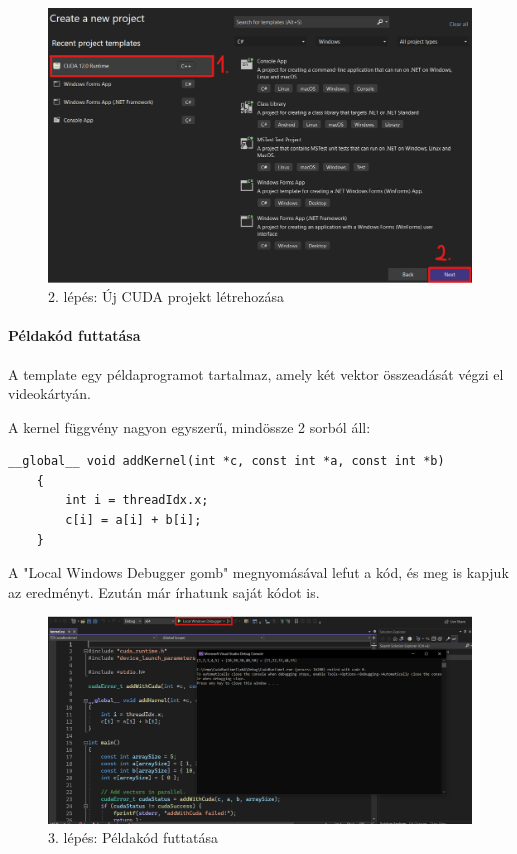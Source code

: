 \begin{figure}[ht!]
	\centering
	\includegraphics[width=150mm, keepaspectratio] {figures/install-2.png}
	\caption{2. lépés: Új CUDA projekt létrehozása}
\end{figure}

\paragraph{Példakód futtatása}
A template egy példaprogramot tartalmaz, amely két vektor összeadását végzi el videokártyán.

A kernel függvény nagyon egyszerű, mindössze 2 sorból áll: \cite{CUDAdoc}
\begin{lstlisting}[style=CStyle]
	__global__ void addKernel(int *c, const int *a, const int *b)
	{
		int i = threadIdx.x;
		c[i] = a[i] + b[i];
	}
\end{lstlisting} 

A "Local Windows Debugger gomb" megnyomásával lefut a kód, és meg is kapjuk az eredményt. Ezután már írhatunk saját kódot is.

\begin{figure}[ht!]
	\centering
	\includegraphics[width=150mm, keepaspectratio] {figures/install-3.png}
	\caption{3. lépés: Példakód futtatása}
\end{figure}